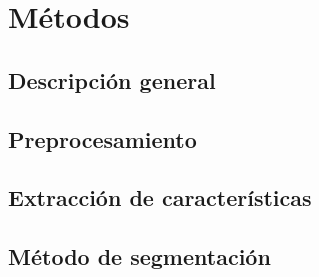 
\chapter{M\'etodos} %

\label{ChapterX} %


\section{Descripci\'on general}

\section{Preprocesamiento}

\section{Extracci\'on de caracter\'isticas}

\section{M\'etodo de segmentaci\'on}